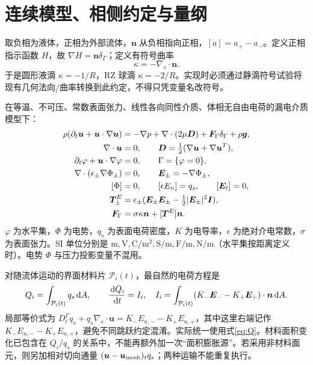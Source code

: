 \documentclass[UTF8,a4paper,11pt,fontset=fandol]{ctexart}
\numberwithin{equation}{section}
\newcommand{\uu}{\bm u}\newcommand{\UU}{\bm U}\newcommand{\FF}{\bm F}
\newcommand{\nn}{\bm n}\newcommand{\bb}{\bm b}\newcommand{\acc}{\bm a}
\begin{document}
\section{连续模型、相侧约定与量纲}
取负相为液体，正相为外部流体，$\nn$ 从负相指向正相，$[a]=a_+-a_-$。定义正相指示函数 $H$，故 $\nabla H=\nn\delta_\Gamma$；定义有符号曲率
\begin{equation}
 \kappa=-\nabla_s\cdot\nn.
\end{equation}
于是圆形液滴 $\kappa=-1/R$，RZ 球滴 $\kappa=-2/R$。实现时必须通过静滴符号试验将现有几何法向/曲率转换到此约定，不得只凭变量名改符号。

在等温、不可压、常数表面张力、线性各向同性介质、体相无自由电荷的漏电介质模型下：
\begin{subequations}\label{eq:model}
\begin{align}
 \rho(\partial_t\uu+\uu\cdot\nabla\uu)&=-\nabla p+\nabla\cdot(2\mu\bm D)+\FF_\Gamma\delta_\Gamma+\rho\bm g,\\
 \nabla\cdot\uu&=0,\qquad \bm D=\tfrac12(\nabla\uu+\nabla\uu^T),\\
 \partial_t\varphi+\uu\cdot\nabla\varphi&=0,\qquad \Gamma=\{\varphi=0\},\\
 \nabla\cdot(\epsilon_\pm\nabla\Phi_\pm)&=0,\qquad \EE_\pm=-\nabla\Phi_\pm,\\
 [\Phi]&=0,\qquad [\epsilon E_n]=q_s,\qquad[\EE_t]=0,\\
 \bm T^E_\pm&=\epsilon_\pm(\EE_\pm\EE_\pm-\tfrac12|\EE_\pm|^2\bm I),\\
 \FF_\Gamma&=\sigma\kappa\nn+[\bm T^E]\nn .
\end{align}
\end{subequations}
$\varphi$ 为水平集，$\Phi$ 为电势，$q_s$ 为表面电荷密度，$K$ 为电导率，$\epsilon$ 为绝对介电常数，$\sigma$ 为表面张力。SI 单位分别是 $\mathrm{m,V,C/m^2,S/m,F/m,N/m}$（水平集按距离定义时）。电势 $\Phi$ 与压力投影变量不混用。

对随流体运动的界面材料片 $\mathcal P_i(t)$，最自然的电荷方程是
\begin{equation}\label{eq:Q}
 Q_i=\int_{\mathcal P_i(t)}q_s\dd A,\qquad
 \frac{\dd Q_i}{\dd t}=I_i,
 \quad I_i=\int_{\mathcal P_i(t)}(K_-\EE_- -K_+\EE_+)\cdot\nn\dd A.
\end{equation}
局部等价式为 $D_t^\Gamma q_s+q_s\nabla_s\cdot\uu=K_-E_{n,-}-K_+E_{n,+}$，其中这里右端记作 $K_-E_{n,-}-K_+E_{n,+}$，避免不同跳跃约定混淆。实际统一使用式\eqref{eq:Q}。材料面积变化已包含在 $Q_i/q_s$ 的关系中，不能再额外加一次“面积膨胀源”。若采用非材料面元，则另加相对切向通量 $(\uu-\uu_{\rm mesh})_tq_s$；两种运输不能重复执行。
\end{document}
